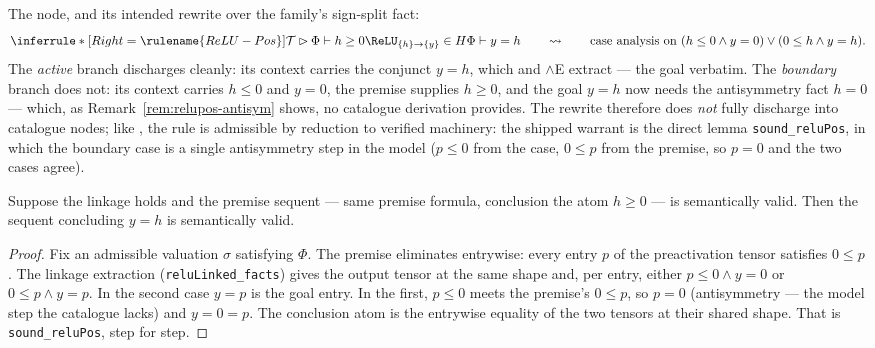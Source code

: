 

\begin{brecipe}\label{rec:relupos-instance}
The node, and its intended rewrite over the family's sign-split fact:
\[
\inferrule*[Right=\rulename{ReLU-Pos}]{
  \mathcal{T} \rhd \Phi \vdash h \geq 0 \\
  \ReLU_{\{h\}\to\{y\}} \in H
}{
  \Phi \vdash y = h
}
\qquad\rightsquigarrow\qquad
\text{case analysis on }
(h \leq 0 \wedge y = 0) \vee (0 \leq h \wedge y = h).
\]
The \emph{active} branch discharges cleanly: its context carries the
conjunct $y = h$, which  and $\wedge$E extract --- the
goal verbatim. The \emph{boundary} branch does not: its context
carries $h \leq 0$ and $y = 0$, the premise supplies $h \geq 0$, and
the goal $y = h$ now needs the antisymmetry fact $h = 0$ --- which, as
Remark~\ref{rem:relupos-antisym} shows, no catalogue derivation
provides. The rewrite therefore does \emph{not} fully discharge into
catalogue nodes; like , the rule is admissible
by reduction to verified machinery: the shipped warrant is the direct
lemma \texttt{sound\_reluPos}, in which the boundary case is a single
antisymmetry step in the model ($p \leq 0$ from the case, $0 \leq p$
from the premise, so $p = 0$ and the two cases agree).
\end{brecipe}

\begin{bprop}\label{prop:relupos-sound}
Suppose the linkage holds and the premise sequent --- same premise
formula, conclusion the atom $h \geq 0$ --- is semantically valid.
Then the sequent concluding $y = h$ is semantically valid.
\end{bprop}
\begin{proof}
Fix an admissible valuation $\sigma$ satisfying $\Phi$. The premise
eliminates entrywise: every entry $p$ of the preactivation tensor
satisfies $0 \leq p$. The linkage extraction
(\texttt{reluLinked\_facts}) gives the output tensor at the same
shape and, per entry, either $p \leq 0 \wedge y = 0$ or $0 \leq p
\wedge y = p$. In the second case $y = p$ is the goal entry. In the
first, $p \leq 0$ meets the premise's $0 \leq p$, so $p = 0$
(antisymmetry --- the model step the catalogue lacks) and $y = 0 = p$.
The conclusion atom is the entrywise equality of the two tensors at
their shared shape. That is \texttt{sound\_reluPos}, step for step.
\end{proof}

